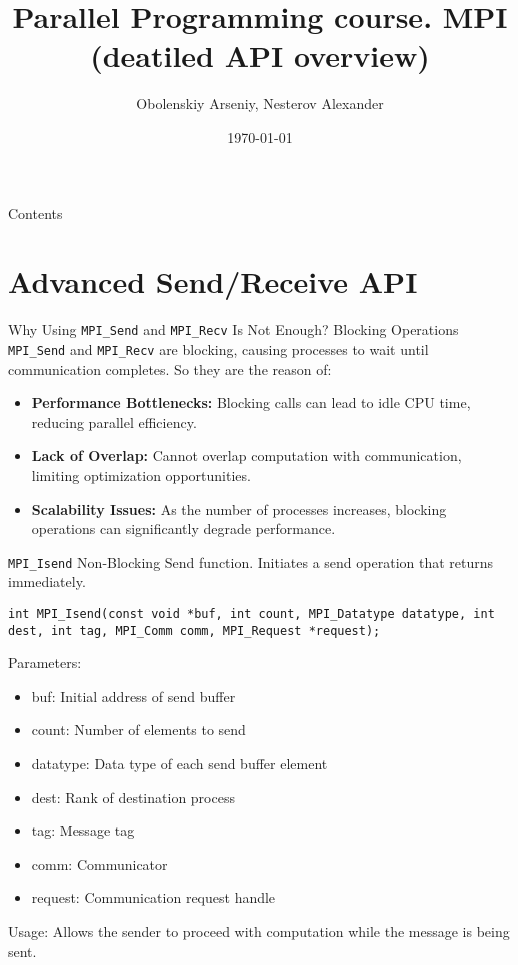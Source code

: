 \documentclass{beamer}
\title[Parallel Programming. MPI (deatiled API overview)]{Parallel Programming course. MPI (deatiled API overview)}
\author{Obolenskiy Arseniy, Nesterov Alexander}
\institute{Nizhny Novgorod State University}
\date{\today} %
\begin{document}
\begin{frame}
    \titlepage
\end{frame}

\begin{frame}{Contents}
    \tableofcontents
\end{frame}

\section{Advanced Send/Receive API}

\begin{frame}{Why Using \texttt{MPI\_Send} and \texttt{MPI\_Recv} Is Not Enough?}
  Blocking Operations \texttt{MPI\_Send} and \texttt{MPI\_Recv} are blocking, causing processes to wait until communication completes.
  So they are the reason of:
  \begin{itemize}
    \item \textbf{Performance Bottlenecks:} Blocking calls can lead to idle CPU time, reducing parallel efficiency.
    \item \textbf{Lack of Overlap:} Cannot overlap computation with communication, limiting optimization opportunities.
    \item \textbf{Scalability Issues:} As the number of processes increases, blocking operations can significantly degrade performance.
  \end{itemize}
\end{frame}

\begin{frame}{\texttt{MPI\_Isend}}
  Non-Blocking Send function. Initiates a send operation that returns immediately.

  \texttt{int MPI\_Isend(const void *buf, int count, MPI\_Datatype datatype, int dest, int tag, MPI\_Comm comm, MPI\_Request *request);}

  Parameters:

  \begin{itemize}
    \item buf: Initial address of send buffer
    \item count: Number of elements to send
    \item datatype: Data type of each send buffer element
    \item dest: Rank of destination process
    \item tag: Message tag
    \item comm: Communicator
    \item request: Communication request handle
  \end{itemize}
  Usage: Allows the sender to proceed with computation while the message is being sent.
\end{frame}
\end{document}
